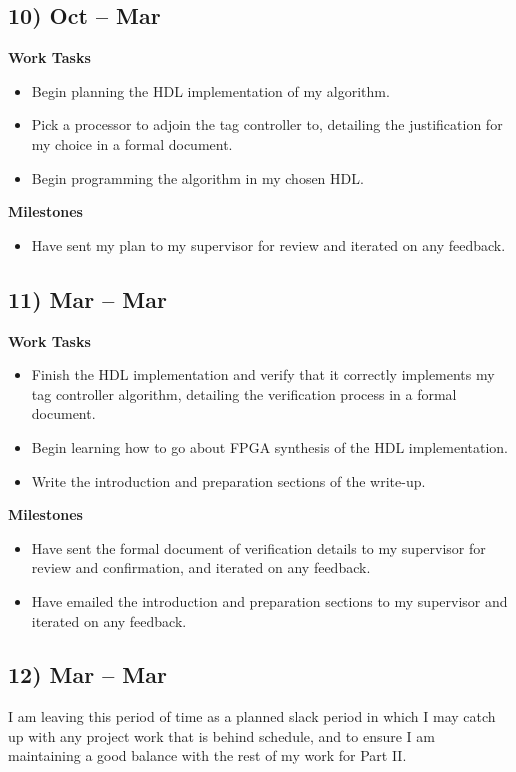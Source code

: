 \documentclass[10pt,a4paper]{article}
\begin{document}
\subsection*{10)  Oct --  Mar}
\textbf{Work Tasks}
\begin{itemize}
	\item Begin planning the HDL implementation of my algorithm.
	\item Pick a processor to adjoin the tag controller to, detailing the justification for my choice in a formal document.
	\item Begin programming the algorithm in my chosen HDL.
\end{itemize}

\textbf{Milestones}
\begin{itemize}
	\item Have sent my plan to my supervisor for review and iterated on any feedback.
\end{itemize}

\subsection*{11)  Mar --  Mar}
\textbf{Work Tasks}
\begin{itemize}
	\item Finish the HDL implementation and verify that it correctly implements my tag controller algorithm, detailing the verification process in a formal document.
	\item Begin learning how to go about FPGA synthesis of the HDL implementation.
	\item Write the introduction and preparation sections of the write-up.
\end{itemize}

\textbf{Milestones}
\begin{itemize}
	\item Have sent the formal document of verification details to my supervisor for review and confirmation, and iterated on any feedback.
	\item Have emailed the introduction and preparation sections to my supervisor and iterated on any feedback.
\end{itemize}

\subsection*{12)  Mar --  Mar}
I am leaving this period of time as a planned slack period in which I may catch up with any project work that is behind schedule, and to ensure I am maintaining a good balance with the rest of my work for Part II.
\end{document}
